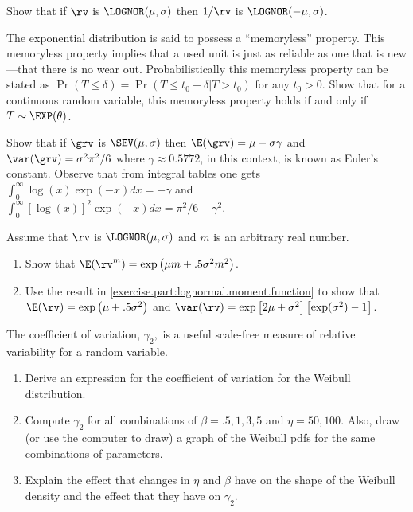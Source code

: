 \begin{exercise}
Show that if $\rv$ is $\LOGNOR(\mu,\sigma)$ then
      $1/\rv$ is $\LOGNOR(-\mu, \sigma)$.
\end{exercise}

\begin{exercise}
The exponential distribution is said to possess a ``memoryless''
property.  This memoryless property implies that a used unit is just
as reliable as one that is new---that there is no wear out.
Probabilistically this memoryless property can be stated as $\Pr(T
\leq \delta) = \Pr(T\leq t_{0}+ \delta|T>t_{0})$ for any $t_{0}>0$.
Show that for a continuous random variable, this memoryless property
holds if and only if $T \sim\EXP(\theta)$.
\end{exercise}


\begin{exercise1}
Show that if $\grv$ is $\SEV(\mu, \sigma)$ then 
$\E(\grv)=\mu-\sigma \gamma$
and $ \var(\grv)=\sigma^{2}\pi^{2}/6$
where $\gamma \approx 0.5772$, in this
context, is known as Euler's constant.  Observe that from
integral tables one gets $\int^{\infty}_{0} \log(x) \exp(-x) dx =
-\gamma$ and $\int^{\infty}_{0} [\log(x)]^{2} \exp(-x) dx =
\pi^{2}/6+\gamma^{2}$.
\end{exercise1}

\begin{exercise1}
Assume that $\rv$ is $\LOGNOR(\mu, \sigma)$ and $m$ is an arbitrary
real number.
\begin{enumerate} 		
\item 
\label{exercise.part:lognormal.moment.function}
Show that $\E(\rv^{m} )= \exp\left (\mu m + .5 \sigma^{2} m^{2} \right )$.
\item 
Use the result
in \ref{exercise.part:lognormal.moment.function} to show that 	 
$\E(\rv)=\exp \left
(\mu + .5 \sigma ^{2} \right )$ and $\var(\rv)= \exp
\left [2 \mu + \sigma^{2} \right ] 		 \left
[\exp(\sigma^{2}) -1 \right ]$.
\end{enumerate}
\end{exercise1}

\begin{exercise}
\label{exercise:weibullcv}
The coefficient of variation, $\gamma_{2},$ is a useful scale-free
measure of relative variability for a random variable.
\begin{enumerate}
\item
Derive an expression for the coefficient of variation for the
Weibull distribution.
\item
Compute $\gamma_{2}$ for all combinations of $\beta=.5, 1, 3, 5$ and
$\eta=50, 100.$ Also, draw (or use the computer to draw) a graph of
the Weibull pdfs for the same combinations of parameters.
\item
Explain the effect that changes in $\eta$ and $\beta$ have on the
shape of the Weibull density and the effect that they have on
$\gamma_{2}.$
\end{enumerate}
\end{exercise}

